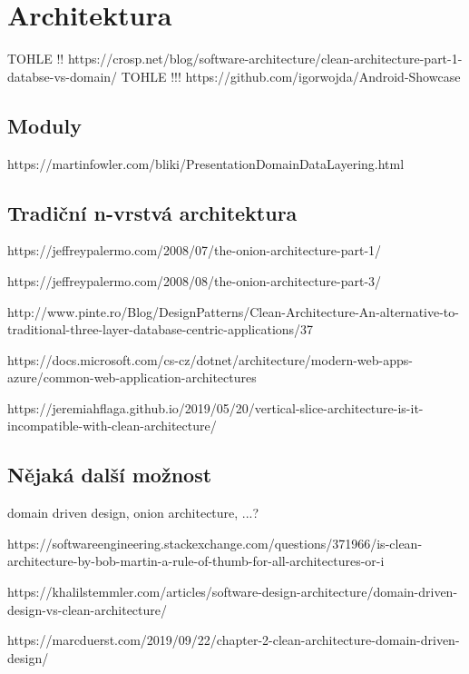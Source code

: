 \section{Architektura}

TOHLE !! https://crosp.net/blog/software-architecture/clean-architecture-part-1-databse-vs-domain/
TOHLE !!! https://github.com/igorwojda/Android-Showcase

\subsection{Moduly}


https://martinfowler.com/bliki/PresentationDomainDataLayering.html

\subsection{Tradiční n-vrstvá architektura}

https://jeffreypalermo.com/2008/07/the-onion-architecture-part-1/

https://jeffreypalermo.com/2008/08/the-onion-architecture-part-3/

http://www.pinte.ro/Blog/DesignPatterns/Clean-Architecture-An-alternative-to-traditional-three-layer-database-centric-applications/37

https://docs.microsoft.com/cs-cz/dotnet/architecture/modern-web-apps-azure/common-web-application-architectures

https://jeremiahflaga.github.io/2019/05/20/vertical-slice-architecture-is-it-incompatible-with-clean-architecture/

\subsection{Nějaká další možnost}

domain driven design, onion architecture, ...? 


https://softwareengineering.stackexchange.com/questions/371966/is-clean-architecture-by-bob-martin-a-rule-of-thumb-for-all-architectures-or-i

https://khalilstemmler.com/articles/software-design-architecture/domain-driven-design-vs-clean-architecture/

https://marcduerst.com/2019/09/22/chapter-2-clean-architecture-domain-driven-design/


